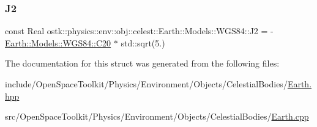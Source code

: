 \subsubsection{\texorpdfstring{J2}{J2}}
{\footnotesize\ttfamily const Real ostk\+::physics\+::env\+::obj\+::celest\+::\+Earth\+::\+Models\+::\+W\+G\+S84\+::\+J2 = -\/\hyperlink{structostk_1_1physics_1_1env_1_1obj_1_1celest_1_1_earth_1_1_models_1_1_w_g_s84_ae42abb8da1cf5323b3b01e604a2743ce}{Earth\+::\+Models\+::\+W\+G\+S84\+::\+C20} $\ast$ std\+::sqrt(5.)\hspace{0.3cm}{\ttfamily [static]}}



The documentation for this struct was generated from the following files\+:\begin{DoxyCompactItemize}
\item 
include/\+Open\+Space\+Toolkit/\+Physics/\+Environment/\+Objects/\+Celestial\+Bodies/\hyperlink{_objects_2_celestial_bodies_2_earth_8hpp}{Earth.\+hpp}\item 
src/\+Open\+Space\+Toolkit/\+Physics/\+Environment/\+Objects/\+Celestial\+Bodies/\hyperlink{_objects_2_celestial_bodies_2_earth_8cpp}{Earth.\+cpp}\end{DoxyCompactItemize}

